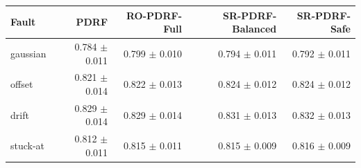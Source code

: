 \begin{tabular}{lrrrr}
\toprule
Fault & PDRF & RO-PDRF-Full & SR-PDRF-Balanced & SR-PDRF-Safe \\
\midrule
gaussian & 0.784 $\pm$ 0.011 & 0.799 $\pm$ 0.010 & 0.794 $\pm$ 0.011 & 0.792 $\pm$ 0.011 \\
offset & 0.821 $\pm$ 0.014 & 0.822 $\pm$ 0.013 & 0.824 $\pm$ 0.012 & 0.824 $\pm$ 0.012 \\
drift & 0.829 $\pm$ 0.014 & 0.829 $\pm$ 0.014 & 0.831 $\pm$ 0.013 & 0.832 $\pm$ 0.013 \\
stuck-at & 0.812 $\pm$ 0.011 & 0.815 $\pm$ 0.011 & 0.815 $\pm$ 0.009 & 0.816 $\pm$ 0.009 \\
\bottomrule
\end{tabular}
